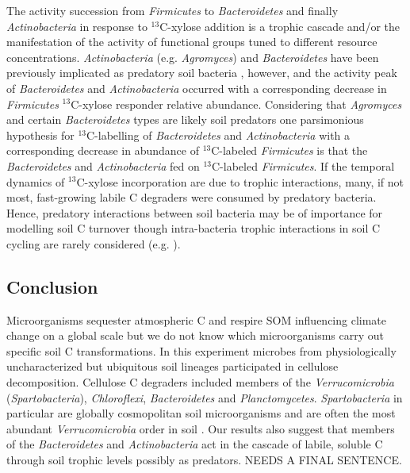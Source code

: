 The activity succession from \textit{Firmicutes} to \textit{Bacteroidetes} and
finally \textit{Actinobacteria} in response to $^{13}$C-xylose addition is
a trophic cascade and/or the manifestation of the activity of functional
groups tuned to different resource concentrations. \textit{Actinobacteria}
(e.g. \textit{Agromyces}) and \textit{Bacteroidetes} have been previously
implicated as predatory soil bacteria \citep{Lueders2006,16346402}, however,
and the activity peak of \textit{Bacteroidetes} and \textit{Actinobacteria}
occurred with a corresponding decrease in \textit{Firmicutes} $^{13}$C-xylose
responder relative abundance. Considering that \textit{Agromyces} and certain
\textit{Bacteroidetes} types are likely soil predators  one parsimonious
hypothesis for $^{13}$C-labelling of \textit{Bacteroidetes} and
\textit{Actinobacteria} with a corresponding decrease in abundance of
$^{13}$C-labeled \textit{Firmicutes} is that the \textit{Bacteroidetes} and
\textit{Actinobacteria} fed on $^{13}$C-labeled \textit{Firmicutes}. If the
temporal dynamics of $^{13}$C-xylose incorporation are due to trophic
interactions, many, if not most, fast-growing labile C degraders were consumed
by predatory bacteria. Hence, predatory interactions between soil bacteria may
be of importance for modelling soil C turnover though intra-bacteria trophic
interactions in soil C cycling are rarely considered (e.g.
\citep{Moore1988}).

\subsection{Conclusion} 
Microorganisms sequester atmospheric C and respire SOM influencing climate
change on a global scale but we do not know which microorganisms carry out
specific soil C transformations. In this experiment microbes from
physiologically uncharacterized but ubiquitous soil lineages participated in
cellulose decomposition. Cellulose C degraders included members of the
\textit{Verrucomicrobia} (\textit{Spartobacteria}), \textit{Chloroflexi},
\textit{Bacteroidetes} and \textit{Planctomycetes}. \textit{Spartobacteria} in
particular are globally cosmopolitan soil microorganisms and are often the most
abundant \textit{Verrucomicrobia} order in soil \citep{Bergmann_2011}. Our
results also suggest that members of the \textit{Bacteroidetes} and
\textit{Actinobacteria} act in the cascade of labile, soluble C through soil
trophic levels possibly as predators. NEEDS A FINAL SENTENCE.
